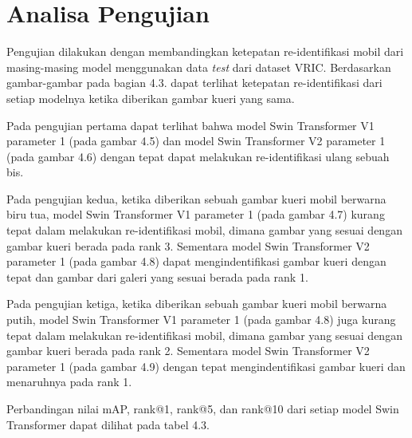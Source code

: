 \section{Analisa Pengujian}
\label{sec:analisapengujian}

Pengujian dilakukan dengan membandingkan ketepatan re-identifikasi mobil dari masing-masing model menggunakan 
data \emph{test} dari dataset VRIC. Berdasarkan gambar-gambar pada bagian 4.3. dapat terlihat ketepatan 
re-identifikasi dari setiap modelnya ketika diberikan gambar kueri yang sama. 

Pada pengujian pertama dapat terlihat bahwa model Swin Transformer V1 parameter 1 (pada gambar 4.5) 
dan model Swin Transformer V2 parameter 1 (pada gambar 4.6) dengan tepat dapat melakukan re-identifikasi 
ulang sebuah bis.

Pada pengujian kedua, ketika diberikan sebuah gambar kueri mobil berwarna biru tua, model Swin Transformer V1 
parameter 1 (pada gambar 4.7) kurang tepat dalam melakukan re-identifikasi mobil, dimana gambar yang sesuai 
dengan gambar kueri berada pada rank 3. Sementara model Swin Transformer V2 parameter 1 (pada gambar 4.8) dapat 
mengindentifikasi gambar kueri dengan tepat dan gambar dari galeri yang sesuai berada pada rank 1.

Pada pengujian ketiga, ketika diberikan sebuah gambar kueri mobil berwarna putih, model Swin Transformer V1 
parameter 1 (pada gambar 4.8) juga kurang tepat dalam melakukan re-identifikasi mobil, dimana gambar yang sesuai 
dengan gambar kueri berada pada rank 2. Sementara model Swin Transformer V2 parameter 1 (pada gambar 4.9) dengan 
tepat mengindentifikasi gambar kueri dan menaruhnya pada rank 1.

Perbandingan nilai mAP, rank@1, rank@5, dan rank@10 dari setiap model Swin Transformer dapat dilihat pada tabel 
4.3.

